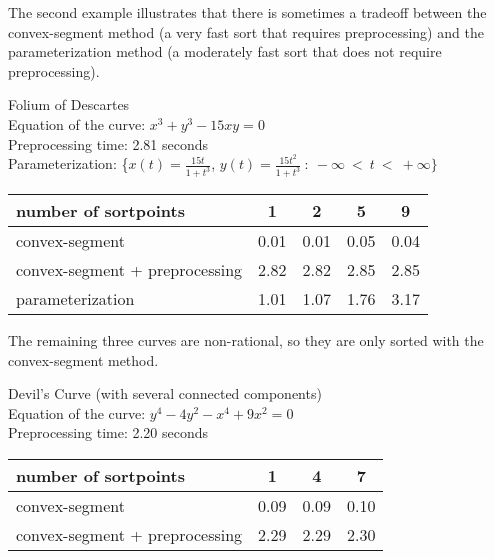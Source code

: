 The second example illustrates that there is sometimes a 
tradeoff between the convex-segment method
(a very fast sort that requires preprocessing) and the parameterization 
method (a moderately fast sort that does not require preprocessing).
%
\begin{example}
\label{eg-folium}
Folium of Descartes\\
Equation of the curve: $x^{3} + y^{3} - 15xy = 0$\\
Preprocessing time: 2.81 seconds\\
Parameterization: \{$x(t) = \frac{15t}{1+t^{3}}$, \vspace{.5in}$y(t) = 
\frac{15t^{2}}{1+t^{3}}\ :\ -\infty\ <\ t\ <\ +\infty \}$ \\
%
\begin{tabular}{|l|c|c|c|c|} \hline
number of sortpoints & 1 & 2 & 5 & 9 \\ \hline \hline
convex-segment &           0.01 & 0.01 & 0.05 & 0.04 \\ \hline
convex-segment + preprocessing & 2.82 & 2.82 & 2.85 & 2.85 \\ \hline
parameterization & 1.01 & 1.07 & 1.76 & 3.17 \\ \hline
\end{tabular}
%
\end{example}
%
The remaining three curves are non-rational, so they are only 
sorted with the convex-segment method.
%
\begin{example}
\label{eg-devil}
Devil's Curve (with several connected components)\\
Equation of the curve: $y^{4} - 4y^{2} - x^{4} + 9x^{2} = 0$\\
Preprocessing time: 2.20 \vspace{.5in}seconds\\
%
\begin{tabular}{|l|c|c|c|} \hline
number of sortpoints & 1 & 4 & 7 \\ \hline \hline
convex-segment & 0.09 & 0.09 & 0.10 \\ \hline
convex-segment + preprocessing & 2.29 & 2.29 & 2.30 \\ \hline
\end{tabular}
%
\end{example}
%

